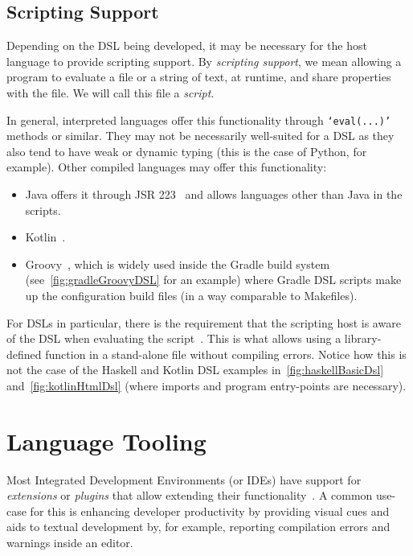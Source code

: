 \subsection{Scripting Support}\label{subsec:scripting-support}

Depending on the DSL being developed, it may be necessary for the host language to provide scripting support.
By \emph{scripting support}, we mean allowing a program to evaluate a file or a string of text, at runtime, and share properties with the file.
We will call this file a \emph{script}.

In general, interpreted languages offer this functionality through \texttt{`eval(...)'} methods or similar.
They may not be necessarily well-suited for a DSL as they also tend to have weak or dynamic typing (this is the case of Python, for example).
Other compiled languages may offer this functionality:
\begin{itemize}
    \item Java offers it through JSR 223~\cite{javaScripting} and allows languages other than Java in the scripts.
    \item Kotlin~\cite{kotlinScriptKeep}.
    \item Groovy~\cite{groovyScripting}, which is widely used inside the Gradle build system (see~\autoref{fig:gradleGroovyDSL} for an example) where Gradle DSL scripts make up the configuration build files (in a way comparable to Makefiles).
\end{itemize}

For DSLs in particular, there is the requirement that the scripting host is aware of the DSL when evaluating the script~\cite{kotlinScriptKeep}.
This is what allows using a library-defined function in a stand-alone file without compiling errors.
Notice how this is not the case of the Haskell and Kotlin DSL examples in~\autoref{fig:haskellBasicDsl} and~\autoref{fig:kotlinHtmlDsl} (where imports and program entry-points are necessary).


\section{Language Tooling}\label{sec:language-tooling}

Most Integrated Development Environments (or IDEs) have support for \emph{extensions} or \emph{plugins} that allow extending their functionality~\cite{ideaExtensionPoints, vscodeExtensions}.
A common use-case for this is enhancing developer productivity by providing visual cues and aids to textual development by, for example, reporting compilation errors and warnings inside an editor.

